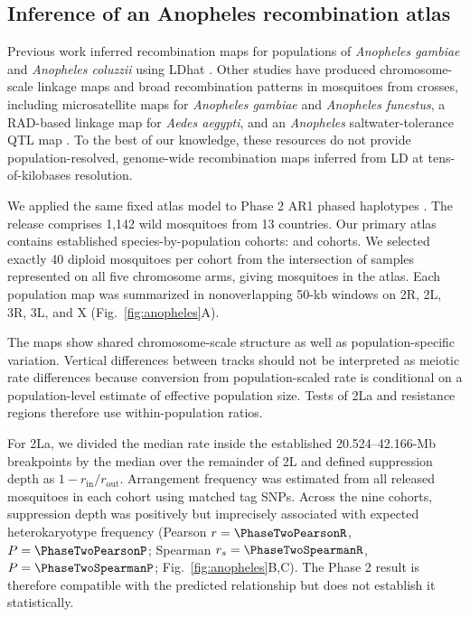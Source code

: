 \subsection*{Inference of an Anopheles recombination atlas}

Previous work inferred recombination maps for populations of \textit{Anopheles gambiae} and \textit{Anopheles coluzzii} using LDhat \citep{nelson2021anopheles}. Other studies have produced chromosome-scale linkage maps and broad recombination patterns in mosquitoes from crosses, including microsatellite maps for \textit{Anopheles gambiae} and \textit{Anopheles funestus}, a RAD-based linkage map for \textit{Aedes aegypti}, and an \textit{Anopheles} saltwater-tolerance QTL map \citep{zheng1996anopheles,wondji2005funestus,juneja2014aedes,smith2015anopheles}. To the best of our knowledge, these resources do not provide population-resolved, genome-wide recombination maps inferred from LD at tens-of-kilobases resolution.

We applied the same fixed atlas model to Phase 2 AR1 phased haplotypes \citep{malariagen_phase2_ar1_2017,ag1000g2020}. The release comprises 1,142 wild mosquitoes from 13 countries. Our primary atlas contains \PhaseTwoCohortCount{} established species-by-population cohorts: \PhaseTwoGambiaeCount{} \Agambiae and \PhaseTwoColuzziiCount{} \Acoluzzii cohorts. We selected exactly 40 diploid mosquitoes per cohort from the intersection of samples represented on all five chromosome arms, giving \PhaseTwoDiploidCount{} mosquitoes in the atlas. Each population map was summarized in nonoverlapping 50-kb windows on 2R, 2L, 3R, 3L, and X (Fig.~\ref{fig:anopheles}A).

The maps show shared chromosome-scale structure as well as population-specific variation. Vertical differences between tracks should not be interpreted as meiotic rate differences because conversion from population-scaled rate is conditional on a population-level estimate of effective population size. Tests of 2La and resistance regions therefore use within-population ratios.

For 2La, we divided the median rate inside the established 20.524--42.166-Mb breakpoints by the median over the remainder of 2L and defined suppression depth as \(1-r_{\mathrm{in}}/r_{\mathrm{out}}\). Arrangement frequency was estimated from all released mosquitoes in each cohort using \PhaseTwoTagSnpCount{} matched tag SNPs. Across the nine cohorts, suppression depth was positively but imprecisely associated with expected heterokaryotype frequency (Pearson \(r=\PhaseTwoPearsonR\), \(P=\PhaseTwoPearsonP\); Spearman \(r_s=\PhaseTwoSpearmanR\), \(P=\PhaseTwoSpearmanP\); Fig.~\ref{fig:anopheles}B,C). The Phase 2 result is therefore compatible with the predicted relationship but does not establish it statistically.

